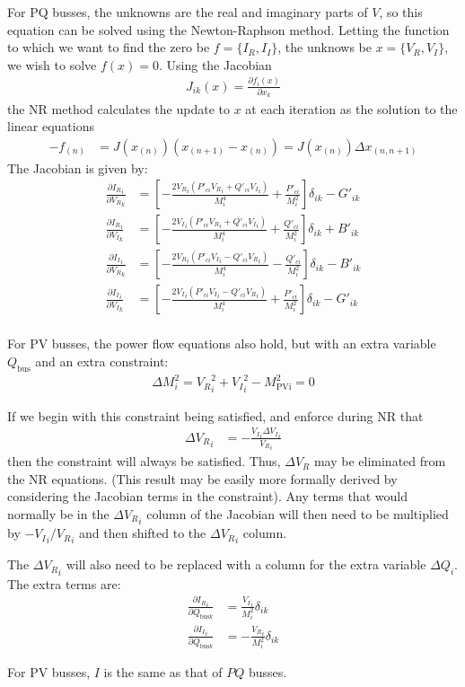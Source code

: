 \documentclass[11pt]{article}
\newcommand{\re}[1]{{{#1}_R}}
\newcommand{\im}[1]{{{#1}_I}}
\begin{document}
For PQ busses, the unknowns are the real and imaginary parts of $V$, so this equation can be solved using the Newton-Raphson method. Letting the function to which we want to find the zero be $f = \{\re{I}, \im{I}\}$, the unknows be $x = \{\re{V}, \im{V}\}$, we wish to solve $f(x) = 0$. Using the Jacobian
\begin{align}
J_{ik}(x) = \frac{\partial f_i(x)}{\partial x_k}
\end{align}
the NR method calculates the update to $x$ at each iteration as the solution to the linear equations
\begin{align}
-f_{(n)} &= J(x_{(n)})(x_{(n+1)}-x_{(n)}) = J(x_{(n)})\Delta x_{(n,n+1)}
\end{align}
The Jacobian is given by:
\begin{align}
\frac{\partial \re{I}_i}{\partial \re{V}_{k}} &= \left[-\frac{2\re{V}_i(P'_{ci}\re{V}_i + Q'_{ci}\im{V}_i)}{M_i^4} + \frac{P'_{ci}}{M_i^2} \right]\delta_{ik} - G'_{ik} \\
\frac{\partial \re{I}_i}{\partial \im{V}_{k}} &= \left[-\frac{2\im{V}_i(P'_{ci}\re{V}_i + Q'_{ci}\im{V}_i)}{M_i^4} + \frac{Q'_{ci}}{M_i^2} \right]\delta_{ik}  + B'_{ik} \\
\frac{\partial \im{I}_i}{\partial \re{V}_{k}} &= \left[-\frac{2\re{V}_i(P'_{ci}\im{V}_i - Q'_{ci}\re{V}_i)}{M_i^4} - \frac{Q'_{ci}}{M_i^2} \right]\delta_{ik}  - B'_{ik} \\
\frac{\partial \im{I}_i}{\partial \im{V}_{k}} &= \left[-\frac{2\im{V}_i(P'_{ci}\im{V}_i - Q'_{ci}\re{V}_i)}{M_i^4} + \frac{P'_{ci}}{M_i^2} \right] \delta_{ik} - G'_{ik} \\
\end{align}

For PV busses, the power flow equations also hold, but with an extra variable $Q_{\text{bus}}$ and an extra constraint:
\begin{align}
\Delta M^2_i = \re{V}_{i}^2 + \im{V}_i^2 - M^2_{\text{PVi}} = 0
\end{align}

If we begin with this constraint being satisfied, and enforce during NR that
\begin{align}
\re{\Delta V}_i &= -\frac{\im{V}_i\im{\Delta V}_i}{\re{V}_i}
\end{align}
then the constraint will always be satisfied. Thus, $\re{\Delta V}$ may be eliminated from the NR equations. (This result may be easily more formally derived by considering the Jacobian terms in the constraint). Any terms that would normally be in the $\re{\Delta V}_i$ column of the Jacobian will then need to be multiplied by $-\im{V}_i/\re{V}_i$ and then shifted to the $\re{\Delta V}_i$ column.

The $\re{\Delta V}_i$ will also need to be replaced with a column for the extra variable $\Delta Q_i$.  The extra terms are:
\begin{align}
\frac{\partial \re{I}_i}{\partial Q_{\text{bus}k}} &= \frac{\im{V}_i}{M_i^2}\delta_{ik} \\
\frac{\partial \im{I}_i}{\partial Q_{\text{bus}k}} &= -\frac{\re{V}_i}{M_i^2}\delta_{ik}
\end{align}

For PV busses, $I$ is the same as that of $PQ$ busses.
\end{document}
